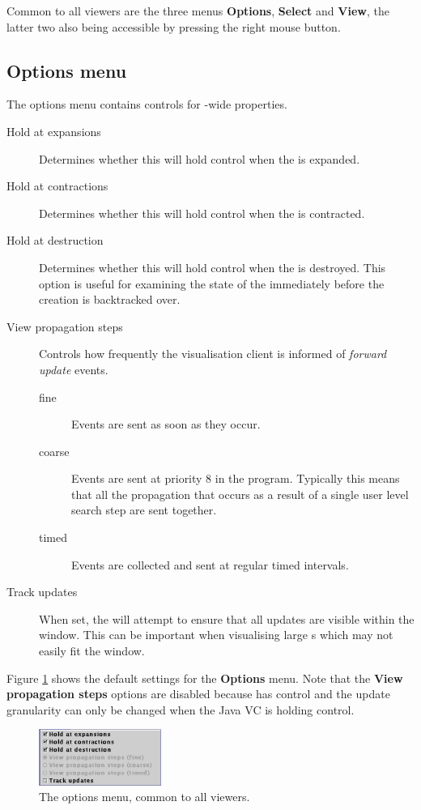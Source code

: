 Common to all viewers are the three menus \textbf{Options},
\textbf{Select} and \textbf{View}, the latter two also being
accessible by pressing the right mouse button.

\subsection{Options menu}
The options menu contains controls for \viewer{}-wide properties.
\begin{description}
\item[Hold at expansions] Determines whether this \viewer{} will hold
control when the \viewable{} is expanded.
\item[Hold at contractions] Determines whether this \viewer{} will hold
control when the \viewable{} is contracted.
\item[Hold at destruction] Determines whether this \viewer{} will hold
control when the \viewable{} is destroyed.  This option is useful for
examining the state of the \viewable{} immediately before the
creation is backtracked over.
\item[View propagation steps] Controls how frequently the visualisation client is informed of \emph{forward update} events.

  \begin{description}
  \item[fine] Events are sent as soon as they occur.
  \item[coarse] Events are sent at priority 8 in the {\eclipse}
  program.  Typically this means that all the propagation that occurs
  as a result of a single user level search step are sent together.
  \item[timed] Events are collected and sent at regular timed
  intervals.
  \end{description}

\item[Track updates] When set, the \viewer{} will attempt to ensure
that all updates are visible within the window.  This can be important
when visualising large \viewable{}s which may not easily fit the
window.
\end{description}

Figure \ref{fig:optionsmenu} shows the default settings for the
\textbf{Options} menu.  Note that the \textbf{View propagation steps}
options are disabled because {\eclipse} has control and the update
granularity can only be changed when the Java VC is holding control.

\begin{figure}[htsp]
\centering
\includegraphics[width=4cm]{vcoptionsmenu}
\caption{The options menu, common to all viewers.}
\label{fig:optionsmenu}
\end{figure}

